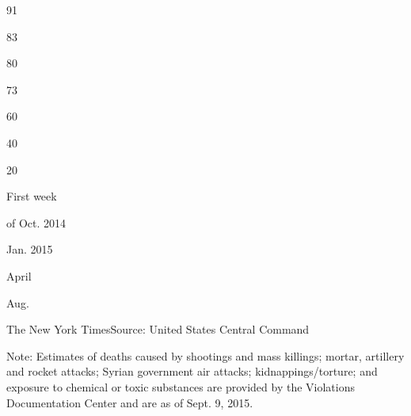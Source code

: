 91

83

80

73

60

40

20

First week

of Oct. 2014

Jan. 2015

April

Aug.

The New York Times\textbar{}Source: United States Central Command

Note: Estimates of deaths caused by shootings and mass killings; mortar,
artillery and rocket attacks; Syrian government air attacks;
kidnappings/torture; and exposure to chemical or toxic substances are
provided by the Violations Documentation Center and are as of Sept. 9,
2015.

\subsection{}

